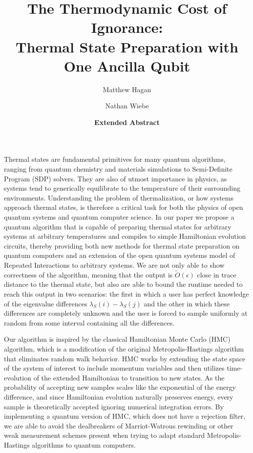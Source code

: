 \documentclass[11pt]{article}
\newcommand{\bigotilde}[1]{\widetilde{O} \left( #1 \right)}
\begin{document}
\title{The Thermodynamic Cost of Ignorance:\\ Thermal State Preparation with One Ancilla Qubit}

\author[1]{Matthew Hagan}
\author[2,3,4]{Nathan Wiebe}
\date{\textbf{Extended Abstract}}
\maketitle
Thermal states are fundamental primitives for many quantum algorithms, ranging from quantum chemistry and materials simulations to Semi-Definite Program (SDP) solvers. They are also of utmost importance in physics, as systems tend to generically equilibrate to the temperature of their surrounding environments. Understanding the problem of thermalization, or how systems approach thermal states, is therefore a critical task for both the physics of open quantum systems and quantum computer science. In our paper we propose a quantum algorithm that is capable of preparing thermal states for arbitrary systems at arbitrary temperatures and compiles to simple Hamiltonian evolution circuits, thereby providing both new methods for thermal state preparation on quantum computers and an extension of the open quantum systems model of Repeated Interactions to arbitrary systems. We are not only able to show correctness of the algorithm, meaning that the output is $\bigotilde{\epsilon}$ close in trace distance to the thermal state, but also are able to bound the runtime needed to reach this output in two scenarios: the first in which a user has perfect knowledge of the eigenvalue differences $\lambda_S(i) - \lambda_S(j)$ and the other in which these differences are completely unknown and the user is forced to sample uniformly at random from some interval containing all the differences.

Our algorithm is inspired by the classical Hamiltonian Monte Carlo (HMC) algorithm, which is a modification of the original Metropolis-Hastings algorithm that eliminates random walk behavior. HMC works by extending the state space of the system of interest to include momentum variables and then utilizes time-evolution of the extended Hamiltonian to transition to new states. As the probability of accepting new samples scales like the exponential of the energy difference, and since Hamiltonian evolution naturally preserves energy, every sample is theoretically accepted ignoring numerical integration errors. By implementing a quantum version of HMC, which does not have a rejection filter, we are able to avoid the dealbreakers of Marriot-Watrous rewinding \cite{temme2011} or other weak measurement schemes \cite{jiang2024quantummetropolissamplingweak} present when trying to adapt standard Metropolis-Hastings algorithms to quantum computers.
\end{document}
